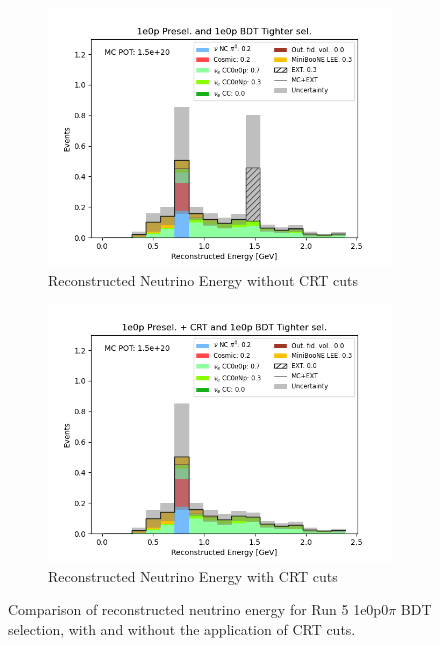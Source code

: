 \begin{figure}[H] \centering
    \begin{subfigure}[t]{0.45\linewidth}
        \includegraphics[width=\linewidth]{technote/EventSelections/FiguresCRT/0PBDT.png}
        \caption{Reconstructed Neutrino Energy without CRT cuts}
    \end{subfigure}%
    \hspace{0.45cm}%
    \begin{subfigure}[t]{0.45\linewidth}
        \includegraphics[width=\linewidth]{technote/EventSelections/FiguresCRT/0PBDTCRT.png}%
        \caption{Reconstructed Neutrino Energy with CRT cuts}
    \end{subfigure}%
    \caption{Comparison of reconstructed neutrino energy for Run 5 1e0p0$\pi$ BDT selection, with and without the application of CRT cuts.}
    \label{fig:1eNp_BDT}
\end{figure}

